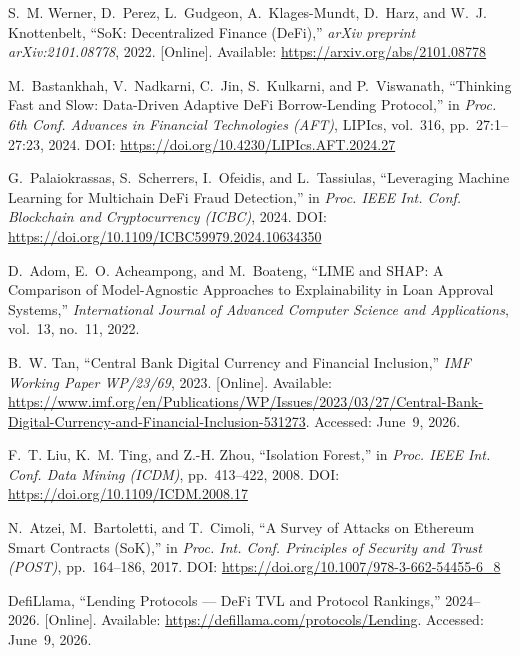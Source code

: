 \documentclass[12pt, a4paper]{report}
\begin{document}
{\small
\begin{enumerate}[label={[\arabic*]}]
\item S.~M. Werner, D.~Perez, L.~Gudgeon, A.~Klages-Mundt, D.~Harz, and W.~J. Knottenbelt, ``SoK: Decentralized Finance (DeFi),'' \textit{arXiv preprint arXiv:2101.08778}, 2022. [Online]. Available: \url{https://arxiv.org/abs/2101.08778}

\item M.~Bastankhah, V.~Nadkarni, C.~Jin, S.~Kulkarni, and P.~Viswanath, ``Thinking Fast and Slow: Data-Driven Adaptive DeFi Borrow-Lending Protocol,'' in \textit{Proc. 6th Conf. Advances in Financial Technologies (AFT)}, LIPIcs, vol.~316, pp.~27:1--27:23, 2024. DOI: \url{https://doi.org/10.4230/LIPIcs.AFT.2024.27}

\item G.~Palaiokrassas, S.~Scherrers, I.~Ofeidis, and L.~Tassiulas, ``Leveraging Machine Learning for Multichain DeFi Fraud Detection,'' in \textit{Proc. IEEE Int. Conf. Blockchain and Cryptocurrency (ICBC)}, 2024. DOI: \url{https://doi.org/10.1109/ICBC59979.2024.10634350}

\item D.~Adom, E.~O. Acheampong, and M.~Boateng, ``LIME and SHAP: A Comparison of Model-Agnostic Approaches to Explainability in Loan Approval Systems,'' \textit{International Journal of Advanced Computer Science and Applications}, vol.~13, no.~11, 2022.

\item B.~W. Tan, ``Central Bank Digital Currency and Financial Inclusion,'' \textit{IMF Working Paper WP/23/69}, 2023. [Online]. Available: \url{https://www.imf.org/en/Publications/WP/Issues/2023/03/27/Central-Bank-Digital-Currency-and-Financial-Inclusion-531273}. Accessed: June~9, 2026.

\item F.~T. Liu, K.~M. Ting, and Z.-H. Zhou, ``Isolation Forest,'' in \textit{Proc. IEEE Int. Conf. Data Mining (ICDM)}, pp.~413--422, 2008. DOI: \url{https://doi.org/10.1109/ICDM.2008.17}

\item N.~Atzei, M.~Bartoletti, and T.~Cimoli, ``A Survey of Attacks on Ethereum Smart Contracts (SoK),'' in \textit{Proc. Int. Conf. Principles of Security and Trust (POST)}, pp.~164--186, 2017. DOI: \url{https://doi.org/10.1007/978-3-662-54455-6_8}

\item DefiLlama, ``Lending Protocols --- DeFi TVL and Protocol Rankings,'' 2024--2026. [Online]. Available: \url{https://defillama.com/protocols/Lending}. Accessed: June~9, 2026.


\end{enumerate}}
\end{document}
